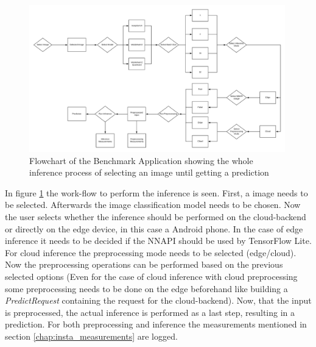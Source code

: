 \begin{figure}[htb]
\centering
\includegraphics[width=0.99\textwidth]{./Bilder/FlowChart_App.png}
\caption{Flowchart of the Benchmark Application showing the whole inference process of selecting an image until getting a prediction}
\label{fig:app}
\end{figure}
In figure \ref{fig:app} the work-flow to perform the inference is seen. First, a image needs to be selected. Afterwards the image classification model needs to be chosen. Now the user selects whether the inference should be performed on the cloud-backend or directly on the edge device, in this case a Android phone. In the case of edge inference it needs to be decided if the NNAPI should be used by TensorFlow Lite. For cloud inference the preprocessing mode needs to be selected (edge/cloud). Now the preprocessing operations can be performed based on the previous selected options (Even for the case of cloud inference with cloud preprocessing some preprocessing needs to be done on the edge beforehand like building a \emph{PredictRequest} containing the request for the cloud-backend). Now, that the input is preprocessed, the actual inference is performed as a last step, resulting in a prediction. For both preprocessing and inference the measurements mentioned in section \ref{chap:insta_measurements} are logged.

